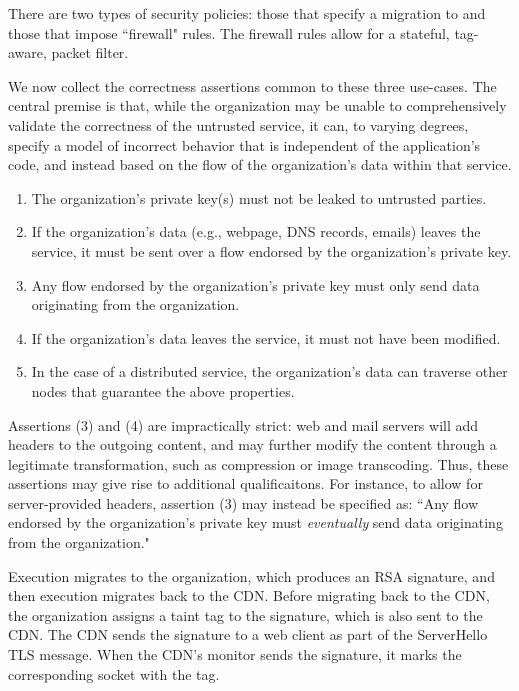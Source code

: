 There are two types of security policies: those that specify a migration to
and those that impose ``firewall" rules.
%
The firewall rules allow for a stateful, tag-aware, packet filter.

We now collect the correctness assertions common to these three use-cases.
%
The central premise is that, while the organization may be unable to
comprehensively validate the correctness of the untrusted service, it can, to
varying degrees, specify a model of incorrect behavior that is independent of the
application's code, and instead based on the flow of the organization's data
within that service. 

\begin{enumerate}
    \item The organization's private key(s) must not be leaked to untrusted parties.

    \item If the organization's data (e.g., webpage, DNS records, emails) leaves the
        service, it must be sent over a flow endorsed by the organization's private
        key.

    \item Any flow endorsed by the organization's private key must only send
        data originating from the organization.

    \item If the organization's data leaves the service, it must not have been
        modified.

    \item In the case of a distributed service, the organization's data can
        traverse other nodes that  guarantee the above properties.
\end{enumerate}

Assertions (3) and (4) are impractically strict: web and mail servers will add
headers to the outgoing content, and may further modify the content through a
legitimate transformation, such as compression or image transcoding.
%
Thus, these assertions may give rise to additional qualificaitons.
%
For instance, to allow for server-provided headers, assertion (3) may instead
be specified as: ``Any flow endorsed by the organization's private key must
\emph{eventually} send data originating from the organization."


%
Execution migrates to the organization, which produces an RSA signature, and
then execution migrates back to the CDN\@.
%
Before migrating back to the CDN, the organization assigns a taint tag to the
signature, which is also sent to the CDN\@.
%
The CDN sends the signature to a web client as part of the ServerHello TLS
message.
%
When the CDN's monitor sends the signature, it marks the corresponding socket
with the tag.


